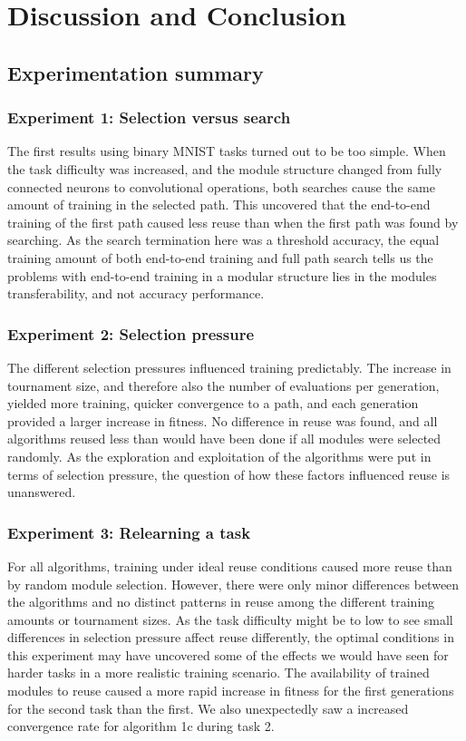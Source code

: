 \chapter{Discussion and Conclusion}

\section{Experimentation summary}
\subsection{Experiment 1: Selection versus search}
The first results using binary MNIST tasks turned out to be too simple. When the task difficulty was increased, and the module structure changed from fully connected neurons to convolutional operations, both searches cause the same amount of training in the selected path. This uncovered that the end-to-end training of the first path caused less reuse than when the first path was found by searching. As the search termination here was a threshold accuracy, the equal training amount of both end-to-end training and full path search tells us the problems with end-to-end training in a modular structure lies in the modules transferability, and not accuracy performance.

\subsection{Experiment 2: Selection pressure}
The different selection pressures influenced training predictably. The increase in tournament size, and therefore also the number of evaluations per generation, yielded more training, quicker convergence to a path, and each generation provided a larger increase in fitness. No difference in reuse was found, and all algorithms reused less than would have been done if all modules were selected randomly. As the exploration and exploitation of the algorithms were put in terms of selection pressure, the question of how these factors influenced reuse is unanswered. 

\subsection{Experiment 3: Relearning a task}
For all algorithms, training under ideal reuse conditions caused more reuse than by random module selection. However, there were only minor differences between the algorithms and no distinct patterns in reuse among the different training amounts or tournament sizes. As the task difficulty might be to low to see small differences in selection pressure affect reuse differently, the optimal conditions in this experiment may have uncovered some of the effects we would have seen for harder tasks in a more realistic training scenario. The availability of trained modules to reuse caused a more rapid increase in fitness for the first generations for the second task than the first. We also unexpectedly saw a increased convergence rate for algorithm 1c during task 2.  

